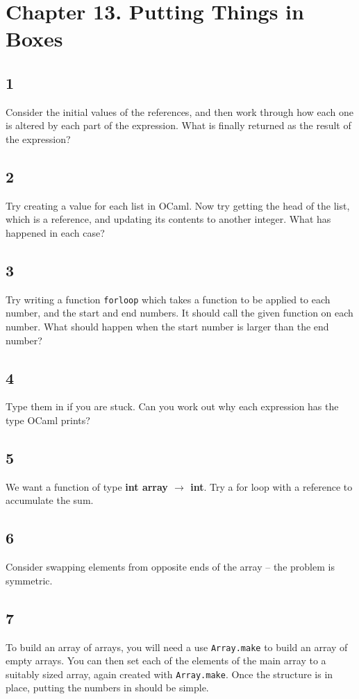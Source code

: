 \documentclass[]{book}
\begin{document}
\section*{Chapter 13. Putting Things in Boxes}
\subsection*{1}
Consider the initial values of the references, and then work through how each one is altered by each part of the expression. What is finally returned as the result of the expression?

\subsection*{2}
Try creating a value for each list in OCaml. Now try getting the head of the list, which is a reference, and updating its contents to another integer. What has happened in each case?

\subsection*{3}
Try writing a function \texttt{forloop} which takes a function to be applied to each number, and the start and end numbers. It should call the given function on each number. What should happen when the start number is larger than the end number?

\subsection*{4}
Type them in if you are stuck. Can you work out why each expression has the type OCaml prints?

\subsection*{5}
We want a function of type \textbf{\textsf{int array $\rightarrow$ int}}. Try a for loop with a reference to accumulate the sum.

\subsection*{6}
Consider swapping elements from opposite ends of the array -- the problem is symmetric.

\subsection*{7}
To build an array of arrays, you will need a use \texttt{Array.make} to build an array of empty arrays. You can then set each of the elements of the main array to a suitably sized array, again created with \texttt{Array.make}. Once the structure is in place, putting the numbers in should be simple.
\end{document}

